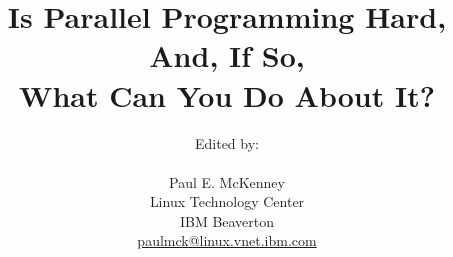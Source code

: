 \documentclass[10pt,twocolumn]{book}
\begin{document}
\makeatletter
\renewcommand\lstinline[1][]{%
\leavevmode\bgroup %
\def\lst@boxpos{b}%
\lsthk@PreSet\lstset{flexiblecolumns,#1}%
\lsthk@TextStyle
\ifnum\iffalse{\fi`}=\z@\fi
\@ifnextchar\bgroup{%
\ifnum`{=\z@}\fi%
\afterassignment\lst@InlineG \let\@let@token}{%
\ifnum`{=\z@}\fi\lstinline@}}
\makeatother
% ---  End of workaround for Fedora 23 Texlive bug
\newcommand{\co}[1]{\lstinline[breaklines=true,breakatwhitespace=true]{#1}}
\newcommand{\nbco}[1]{\hbox{\lstinline[breaklines=false,breakatwhitespace=false]{#1}}} % no break lines for short snippet
\newcommand{\qco}[1]{``\nbco{#1}''} % \nbco with quotation marks
\newcommand{\tco}[1]{\texttt{\detokenize{#1}}} % for code in tabular environment
% \tco{} will break at spaces but not at underscores
\newcommand{\nf}[1]{\textnormal{#1}} % to return to normal font
\newcommand{\qop}[1]{{\sffamily #1}} % QC operator such as H, T, S, etc.

\DeclareRobustCommand{\euler}{\ensuremath{\mathrm{e}}}
\DeclareRobustCommand{\O}[1]{\ensuremath{\mathcal{O}(#1)}}
\newcommand{\Power}[1]{POWER#1}
\newcommand{\GNUC}{GNU~C}
\newcommand{\GCC}{GCC}
%\newcommand{\GCC}{\co{gcc}} % For those who prefer "gcc"
\newcommand{\IRQ}{IRQ}
%\newcommand{\IRQ}{irq}      % For those who prefer "irq"
\newcommand{\mytexttrademark}{}
\newcommand{\mytextregistered}{}
%\newcommand{\mytexttrademark}{\textsuperscript\texttrademark}
%\newcommand{\mytextregistered}{\textsuperscript\textregistered}

\newcommand{\Epigraph}[2]{\epigraphhead[65]{\rmfamily\epigraph{#1}{#2}}}

 % Hyphenation exceptions for US English from hyphenex package
 % Hyphenation exceptions for perfbook

\title{
  Is Parallel Programming Hard, And, If So, \\
  What Can You Do About It?}
\author{
	Edited by: \\
	\\
	Paul E. McKenney \\
	Linux Technology Center \\
	IBM Beaverton \\
	\href{mailto:paulmck@linux.vnet.ibm.com}{paulmck@linux.vnet.ibm.com} \\
} %

\end{document}
